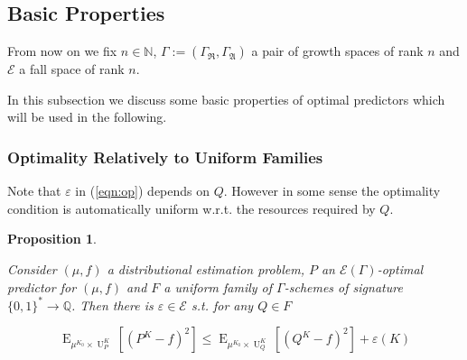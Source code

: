 \documentclass{article}
\numberwithin{equation}{section}
\theoremstyle{definition}
\theoremstyle{plain}
\newtheorem{proposition}{Proposition}[section]
\newcommand{\Bool}{\{0,1\}}
\newcommand{\Words}{{\Bool^*}}
\DeclareMathOperator{\E}{E}
\DeclareMathOperator{\Un}{U}
\newcommand{\Nats}{\mathbb{N}}
\newcommand{\Rats}{\mathbb{Q}}
\newcommand{\GrowR}{\Gamma_{\mathfrak{R}}}
\newcommand{\GrowA}{\Gamma_{\mathfrak{A}}}
\newcommand{\Grow}{\Gamma:=(\GrowR,\GrowA)}
\newcommand{\Fall}{\mathcal{E}}
\newcommand{\EG}{\Fall(\Gamma)}
\begin{document}
\subsection{Basic Properties}

From now on we fix $n \in \Nats$, $\Grow$ a pair of growth spaces of rank $n$ and $\Fall$ a fall space of rank $n$.

In this subsection we discuss some basic properties of optimal predictors which will be used in the following.

\subsubsection{Optimality Relatively to Uniform Families}

Note that $\varepsilon$ in (\ref{eqn:op}) depends on $Q$. However in some sense the optimality condition is automatically uniform w.r.t. the resources required by $Q$.

\begin{proposition}
\label{prp:unif}

Consider $(\mu,f)$ a distributional estimation problem, $P$ an $\EG$-optimal predictor for $(\mu,f)$ and $F$ a uniform family of $\Gamma$-schemes of signature $\Words \rightarrow \Rats$. Then there is $\varepsilon \in \Fall$ s.t. for any $Q \in F$

\begin{equation}
\E_{\mu^{K_0} \times \Un_P^{K}}[(P^{K} - f)^2] \leq \E_{\mu^{K_0} \times \Un_Q^{K}}[(Q^{K} - f)^2] + \varepsilon(K)
\end{equation}

\end{proposition}
\end{document}
